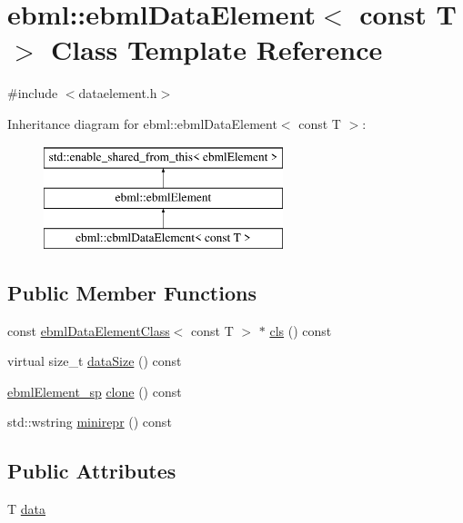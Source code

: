 \hypertarget{classebml_1_1ebmlDataElement_3_01const_01T_01_4}{}\section{ebml\+:\+:ebml\+Data\+Element$<$ const T $>$ Class Template Reference}
\label{classebml_1_1ebmlDataElement_3_01const_01T_01_4}


{\ttfamily \#include $<$dataelement.\+h$>$}

Inheritance diagram for ebml\+:\+:ebml\+Data\+Element$<$ const T $>$\+:\begin{figure}[H]
\begin{center}
\leavevmode
\includegraphics[height=3.000000cm]{classebml_1_1ebmlDataElement_3_01const_01T_01_4}
\end{center}
\end{figure}
\subsection*{Public Member Functions}
\begin{DoxyCompactItemize}
\item 
const \mbox{\hyperlink{classebml_1_1ebmlDataElementClass}{ebml\+Data\+Element\+Class}}$<$ const T $>$ $\ast$ \mbox{\hyperlink{classebml_1_1ebmlDataElement_3_01const_01T_01_4_a27173a9d7784ce0cfca71e1c72c36ec7}{cls}} () const
\item 
virtual size\+\_\+t \mbox{\hyperlink{classebml_1_1ebmlDataElement_3_01const_01T_01_4_a0965d2da67f1862d2c806151063dcfce}{data\+Size}} () const
\item 
\mbox{\hyperlink{namespaceebml_adad533b7705a16bb360fe56380c5e7be}{ebml\+Element\+\_\+sp}} \mbox{\hyperlink{classebml_1_1ebmlDataElement_3_01const_01T_01_4_a23f7032682dfdf20ce042caf144e50d6}{clone}} () const
\item 
std\+::wstring \mbox{\hyperlink{classebml_1_1ebmlDataElement_3_01const_01T_01_4_aa5a82c4528609bf788caf8db8927fbc1}{minirepr}} () const
\end{DoxyCompactItemize}
\subsection*{Public Attributes}
\begin{DoxyCompactItemize}
\item 
T \mbox{\hyperlink{classebml_1_1ebmlDataElement_3_01const_01T_01_4_ac3870bb3b5d9d0e3063a80768fe83904}{data}}
\end{DoxyCompactItemize}
